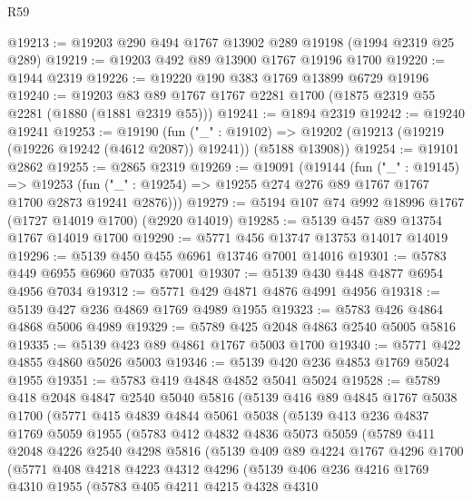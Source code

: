 \begin{lexlean}{R59}
\begin{coremodule}
@19213 := @19203 @290 @494 @1767 @13902 @289 @19198 (@1994 @2319 @25 @289)
@19219 := @19203 @492 @89 @13900 @1767 @19196 @1700
@19220 := @1944 @2319
@19226 := @19220 @190 @383 @1769 @13899 @6729 @19196
@19240 := @19203 @83 @89 @1767 @1767 @2281 @1700 (@1875 @2319 @55 @2281 (@1880 (@1881 @2319 @55)))
@19241 := @1894 @2319
@19242 := @19240 @19241
@19253 := @19190
    (fun ("_" : @19102) =>
    @19202 (@19213 (@19219 (@19226 @19242 (@4612 @2087)) @19241)) (@5188 @13908))
@19254 := @19101 @2862
@19255 := @2865 @2319
@19269 := @19091
    (@19144
      (fun ("_" : @19145) =>
      @19253 (fun ("_" : @19254) => @19255 @274 @276 @89 @1767 @1767 @1700 @2873 @19241 @2876)))
@19279 := @5194 @107 @74 @992 @18996 @1767 (@1727 @14019 @1700) (@2920 @14019)
@19285 := @5139 @457 @89 @13754 @1767 @14019 @1700
@19290 := @5771 @456 @13747 @13753 @14017 @14019
@19296 := @5139 @450 @455 @6961 @13746 @7001 @14016
@19301 := @5783 @449 @6955 @6960 @7035 @7001
@19307 := @5139 @430 @448 @4877 @6954 @4956 @7034
@19312 := @5771 @429 @4871 @4876 @4991 @4956
@19318 := @5139 @427 @236 @4869 @1769 @4989 @1955
@19323 := @5783 @426 @4864 @4868 @5006 @4989
@19329 := @5789 @425 @2048 @4863 @2540 @5005 @5816
@19335 := @5139 @423 @89 @4861 @1767 @5003 @1700
@19340 := @5771 @422 @4855 @4860 @5026 @5003
@19346 := @5139 @420 @236 @4853 @1769 @5024 @1955
@19351 := @5783 @419 @4848 @4852 @5041 @5024
@19528 := @5789
    @418
    @2048
    @4847
    @2540
    @5040
    @5816
    (@5139
      @416
      @89
      @4845
      @1767
      @5038
      @1700
      (@5771
        @415
        @4839
        @4844
        @5061
        @5038
        (@5139
          @413
          @236
          @4837
          @1769
          @5059
          @1955
          (@5783
            @412
            @4832
            @4836
            @5073
            @5059
            (@5789
              @411
              @2048
              @4226
              @2540
              @4298
              @5816
              (@5139
                @409
                @89
                @4224
                @1767
                @4296
                @1700
                (@5771
                  @408
                  @4218
                  @4223
                  @4312
                  @4296
                  (@5139
                    @406
                    @236
                    @4216
                    @1769
                    @4310
                    @1955
                    (@5783
                      @405
                      @4211
                      @4215
                      @4328
                      @4310

\end{coremodule}
\end{lexlean}
